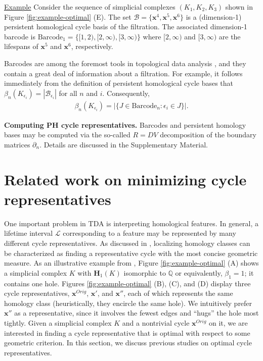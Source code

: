 \documentclass[11pt,onecolumn]{article}
\newcommand{\Homologies}[0]{\mathbf{H}}
\newcommand{\originalrep}{\mathbf{x}^{Orig}}
\newcommand{\optimalrep}{\mathbf{x}}
\newcommand{\barcode}{\mathrm{Barcode}}
\newcommand{\persinterval}{\mathcal{L}}
\newcommand{\interval}{J}
\newcommand{\hcyclebasis}{\mathcal B}
\theoremstyle{plain}
\theoremstyle{definition}
\begin{document}
\noindent \underline{Example}  Consider the sequence of simplicial complexes $(K_1, K_2, K_3)$ shown in Figure \ref{fig:example-optimal} (E).  The set
    $
        \hcyclebasis = \{\optimalrep^4, \optimalrep^5, \optimalrep^6 \}
    $
is a (dimension-1) persistent homological cycle basis of the filtration.  The associated dimension-1 barcode is     
    $
    \barcode_1 = \{[1,2), [2,\infty), [3, \infty) \} 
    $ 
where $[2,\infty)$ and $[3,\infty)$ are the lifespans of  $\optimalrep^5$ and $\optimalrep^6$, respectively.


Barcodes are among the foremost tools in topological data analysis \cite{barcodeGhrist,  persistenthomologyasurvey}, and they contain a great deal of information about a filtration.  For example, it follows  immediately from the definition of persistent homological cycle bases  that
    $
        \beta_n(K_{\epsilon_i})
        =
        |\hcyclebasis_{\epsilon_i}|
    $
for all $n$ and $i$.  Consequently,
    \begin{align*}
        \beta_n(K_{\epsilon_i})
        =
        |\{\interval \in \barcode_n : \epsilon_i \in \interval \}|.
    \end{align*}

\noindent \textbf{Computing PH cycle representatives.} Barcodes and persistent homology bases may be computed via the so-called $R = DV$ decomposition \cite{cohen2006vines} of the boundary matrices $\partial_n$. Details are discussed in the Supplementary Material.


\section{Related work on minimizing cycle representatives}\label{problem formulation}


One important problem in TDA is interpreting homological features. In general, a lifetime interval $\persinterval$ corresponding to a feature may be represented by many different cycle representatives. As discussed in \cite{chenquantifying}, localizing homology classes can be characterized as finding a representative cycle with the most concise geometric measure. As an illustrative example from \cite{Escolar2016}, Figure \ref{fig:example-optimal} (A) shows a simplicial complex $K$ with $\Homologies_1(K)$ isomorphic to $\mathbb{Q}$ or equivalently, $\beta_1=1$; it contains one hole.  Figures \ref{fig:example-optimal} (B), (C), and (D) display three cycle representatives, $\originalrep$, $\optimalrep'$, and $\optimalrep''$, each of which represents the same homology class (heuristically, they encircle the same hole). We intuitively prefer $\optimalrep''$ as a representative, since it involves the fewest edges  and ``hugs'' the hole most tightly. Given a simplicial complex $K$ and a nontrivial cycle $\originalrep$ on it, we are interested in finding a cycle representative that is optimal with respect to some geometric criterion. In this section, we discuss previous studies on optimal cycle representatives. 
\end{document}
